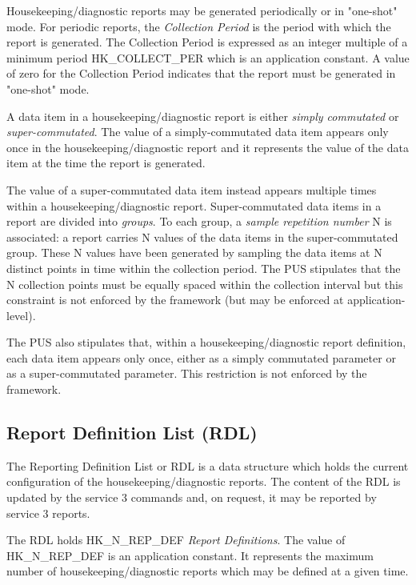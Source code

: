 \documentclass{pnp_article}
\begin{document}
Housekeeping/diagnostic reports may be generated periodically or in "one-shot" mode. For periodic reports, the \textit{Collection Period} is the period with which the report is generated. The Collection Period is expressed as an integer multiple of a minimum period HK\_COLLECT\_PER which is an application constant. A value of zero for the Collection Period indicates that the report must be generated in "one-shot" mode.

A data item in a housekeeping/diagnostic report is either \textit{simply commutated} or \textit{super-commutated}. The value of a simply-commutated data item appears only once in the housekeeping/diagnostic report and it represents the value of the data item at the time the report is generated.

The value of a super-commutated data item instead appears multiple times within a housekeeping/diagnostic report. Super-commutated data items in a report are divided into \textit{groups}. To each group, a \textit{sample repetition number} N is associated: a report carries N values of the data items in the super-commutated group. These N values have been generated by sampling the data items at N distinct points in time within the collection period. The PUS stipulates that the N collection points must be equally spaced within the collection interval but this constraint is not enforced by the framework (but may be enforced at application-level). 

The PUS also stipulates that, within a housekeeping/diagnostic report definition, each data item appears only once, either as a simply commutated parameter or as a super-commutated parameter. This restriction is not enforced by the framework.

\subsection{Report Definition List (RDL)}\label{sec:serv3RDL}
The Reporting Definition List or RDL is a data structure which holds the current configuration of the housekeeping/diagnostic reports. The content of the RDL is updated by the service 3 commands and, on request, it may be reported by service 3 reports.

The RDL holds HK\_N\_REP\_DEF \textit{Report Definitions}. The value of HK\_N\_REP\_DEF is an application constant. It represents the maximum number of housekeeping/diagnostic reports which may be defined at a given time. 
\end{document}

